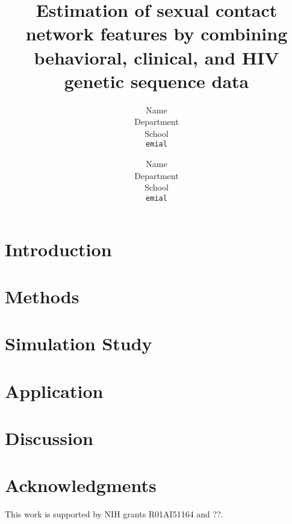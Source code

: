 \documentclass{article}
\title{Estimation of sexual contact network features by combining behavioral, clinical, and HIV genetic sequence data}
\author{
  Name \\
  Department\\
  School\\
  \texttt{emial} \\
  \and
  Name \\
  Department\\
  School\\
  \texttt{emial} \\
}
\begin{document}
\maketitle

\begin{abstract}

\end{abstract}



\section{Introduction}



\section{Methods} \label{sec:method}



\section{Simulation Study}\label{sec:simulation}



\section{Application}
\label{sec:application}


\section{Discussion}

\section*{Acknowledgments}

This work is supported by NIH grants R01AI51164 and ??.

%

\end{document}
